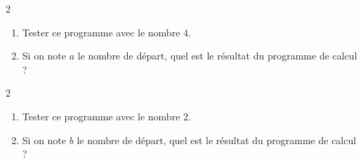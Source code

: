 \documentclass[11pt]{article}
\begin{document}
\phantom{0}
\vspace{-.5cm}



\begin{exercicedevoir}[4]
  \begin{multicols}{2}
\newcolumn

    \begin{enumerate}
    \item Tester ce programme avec le nombre $4$. \\ \encart{3cm} 
    \item Si on note $a$ le nombre de départ, quel est le résultat du programme de calcul ? \\ \encart{3cm}
    \end{enumerate}
  \end{multicols}
\end{exercicedevoir}

\begin{exercicedevoir}[4]
  \begin{multicols}{2}
\newcolumn
    \begin{enumerate}
    \item Tester ce programme avec le nombre $2$. \\ \encart{3cm}
    \item Si on note $b$ le nombre de départ, quel est le résultat du programme de calcul ? \\ \encart{3cm}
    \end{enumerate}
  \end{multicols}
\end{exercicedevoir}
\end{document}
